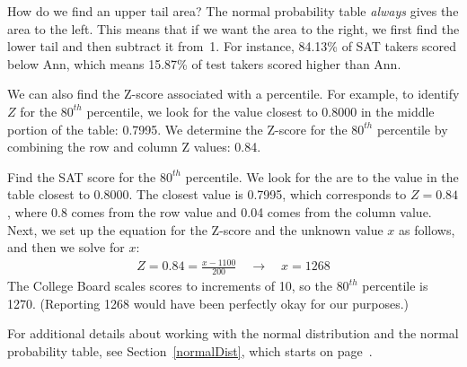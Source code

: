\begin{examplewrap}
\begin{nexample}{How do we find an upper tail area?}
  The normal probability table \emph{always} gives the area
  to the left.
  This means that if we want the area to the right,
  we first find the lower tail and then subtract it from~1.
  For instance, 84.13\% of SAT takers scored below Ann,
  which means 15.87\% of test takers scored higher than Ann.
\end{nexample}
\end{examplewrap}

We can also find the Z-score associated with a percentile.
For example, to identify $Z$ for the $80^{th}$ percentile,
we look for the value closest to 0.8000 in the middle portion
of the table: 0.7995.
We determine the Z-score for the $80^{th}$ percentile by
combining the row and column Z values: 0.84.

\begin{examplewrap}
\begin{nexample}{Find the SAT score for the $80^{th}$ percentile.}
  We look for the are to the value in the table closest to 0.8000.
  The closest value is 0.7995, which corresponds to $Z = 0.84$,
  where 0.8 comes from the row value and 0.04 comes from the
  column value.
  Next, we set up the equation for the Z-score and the unknown
  value $x$ as follows, and then we solve for $x$:
  \begin{align*}
  Z = 0.84 = \frac{x - 1100}{200}
  \quad\to\quad x = 1268
  \end{align*}
  The College Board scales scores to increments of 10,
  so the $80^{th}$ percentile is 1270.
  (Reporting 1268 would have been perfectly okay for our purposes.)
\end{nexample}
\end{examplewrap}

For additional details about working with the normal distribution and the normal probability table, see Section~\ref{normalDist}, which starts on page~\pageref{normalDist}.


